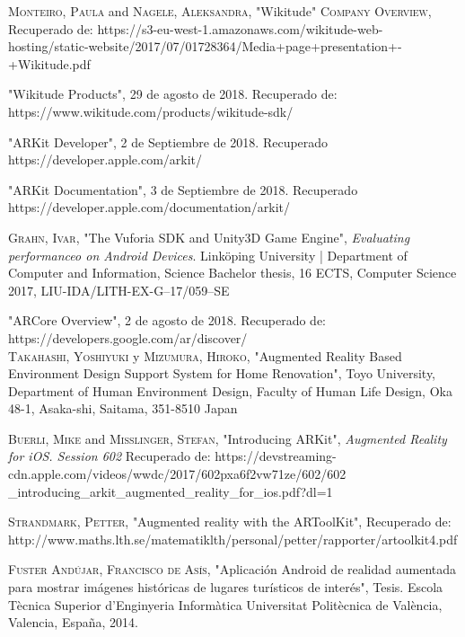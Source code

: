 \begin{thebibliography}{X}
	 \textsc{Monteiro, Paula} and \textsc{Nagele, Aleksandra}, "Wikitude" \textsc{Company Overview}, Recuperado de: https://s3-eu-west-1.amazonaws.com/wikitude-web-hosting/static-website/2017/07/01728364/Media+page+presentation+-+Wikitude.pdf
	
	
	
	 "Wikitude Products", 29 de agosto de 2018. Recuperado de: https://www.wikitude.com/products/wikitude-sdk/
	
	
	 "ARKit Developer", 2 de Septiembre de 2018. Recuperado
	https://developer.apple.com/arkit/
	
	 "ARKit Documentation", 3 de Septiembre de 2018. Recuperado
	https://developer.apple.com/documentation/arkit/
	
	
	 \textsc{Grahn, Ivar}, "The Vuforia SDK and Unity3D Game Engine", \textit{Evaluating performanceo on Android Devices}. Linköping University | Department of Computer and Information, Science Bachelor thesis, 16 ECTS, Computer Science 2017, LIU-IDA/LITH-EX-G–17/059–SE
	
	
	 "ARCore Overview", 2 de agosto de 2018. Recuperado de: https://developers.google.com/ar/discover/
	\\
	
	
	
	 \textsc{Takahashi, Yoshiyuki} y \textsc{Mizumura, Hiroko},
	"Augmented Reality Based Environment Design Support System for Home Renovation", Toyo  University, Department of Human Environment Design, Faculty of Human Life Design, Oka 48-1, Asaka-shi, Saitama, 351-8510 Japan 
	
	
	
	 \textsc{Buerli, Mike} and \textsc{Misslinger, Stefan}, "Introducing ARKit", \textit{Augmented Reality for iOS. Session 602} Recuperado de: https://devstreaming-cdn.apple.com/videos/wwdc/2017/602pxa6f2vw71ze/602/602
	\_introducing\_arkit\_augmented\_reality\_for\_ios.pdf?dl=1
	
	 \textsc{Strandmark, Petter}, "Augmented reality with the ARToolKit", Recuperado de: http://www.maths.lth.se/matematiklth/personal/petter/rapporter/artoolkit4.pdf
	
	 \textsc{Fuster Andújar, Francisco de Asís}, "Aplicación Android de realidad aumentada para mostrar imágenes históricas de lugares turísticos de interés", Tesis. Escola Tècnica Superior d’Enginyeria Informàtica Universitat Politècnica de València, Valencia, España, 2014.
	

\end{thebibliography}

